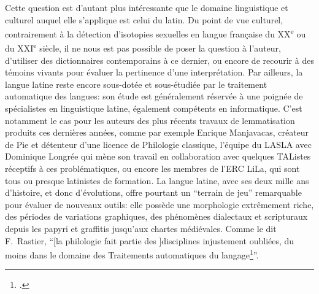Cette question est d'autant plus intéressante que le domaine linguistique et culturel auquel elle s'applique est celui du latin. Du point de vue culturel, contrairement à la détection d'isotopies sexuelles en langue française du XX\textsuperscript{e} ou du XXI\textsuperscript{e} siècle, il ne nous est pas possible de poser la question à l'auteur, d'utiliser des dictionnaires contemporains à ce dernier, ou encore de recourir à des témoins vivants pour évaluer la pertinence d'une interprétation. Par ailleurs, la langue latine reste encore sous-dotée et sous-étudiée par le traitement automatique des langues: son étude est généralement réservée à une poignée de spécialistes en linguistique latine, également compétents en informatique. C'est notamment le cas pour les auteurs des plus récents travaux de lemmatisation produits ces dernières années, comme par exemple Enrique Manjavacas, créateur de Pie et détenteur d'une licence de Philologie classique, l'équipe du LASLA avec Dominique Longrée qui mène son travail en collaboration avec quelques TAListes réceptifs à ces problématiques, ou encore les membres de l'ERC LiLa, qui sont tous ou presque latinistes de formation. La langue latine, avec ses deux mille ans d'histoire, et donc d'évolutions, offre pourtant un \enquote{terrain de jeu} remarquable pour évaluer de nouveaux outils: elle possède une morphologie extrêmement riche, des périodes de variations graphiques, des phénomènes dialectaux et scripturaux depuis les papyri et graffitis jusqu'aux chartes médiévales. Comme le dit F.~Rastier, \enquote{[la philologie fait partie des ]disciplines injustement oubliées, du moins dans le domaine des Traitements automatiques du langage\footcite{rastier2005enjeux}}. 


